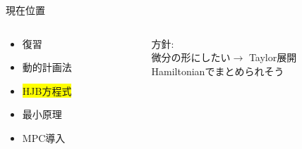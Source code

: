 \documentclass[dvipdfmx,12pt]{beamer}
\begin{document}
    \begin{frame}{現在位置}
        \footnotesize
        \begin{columns}
            \begin{column}{.35\textwidth}
                \begin{itemize}
                    \item 復習
                    \item 動的計画法
                    \item \colorbox{yellow}{HJB方程式}
                    \item 最小原理
                    \item MPC導入
                \end{itemize}
            \end{column}
    
            \begin{column}{.7\textwidth}
               
                \begin{screen}
                    
                    {\fontsize{7.5pt}{6pt}\selectfont
                    \begin{center}
                    \end{center}
                    }
                \end{screen}
                方針:\\
                \qquad 微分の形にしたい$\rightarrow$ Taylor展開\\
                \qquad Hamiltonianでまとめられそう\\
            \end{column}
        \end{columns}
    \end{frame}
\end{document}
